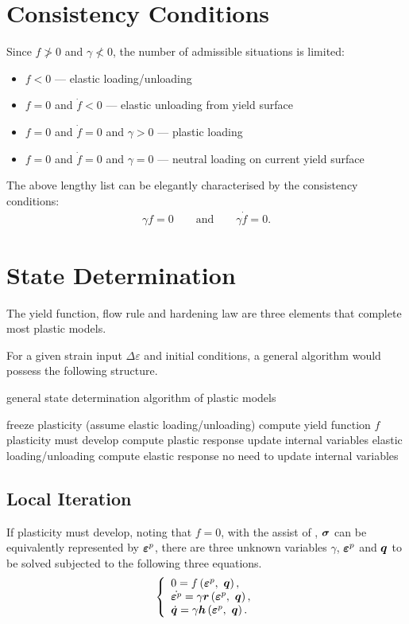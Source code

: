 \section{Consistency Conditions}
Since $f\ngtr0$ and $\gamma\nless0$, the number of admissible situations is limited:
\begin{itemize}
\item $f<0$ --- elastic loading/unloading
\item $f=0$ and $\dot{f}<0$ --- elastic unloading from yield surface
\item $f=0$ and $\dot{f}=0$ and $\gamma>0$ --- plastic loading
\item $f=0$ and $\dot{f}=0$ and $\gamma=0$ --- neutral loading on current yield surface
\end{itemize}
The above lengthy list can be elegantly characterised by the consistency conditions:
\begin{gather}\label{eq:consistency_condition}
\gamma{}f=0\qquad\text{and}\qquad\gamma\dot{f}=0.
\end{gather}
\section{State Determination}
The yield function, flow rule and hardening law are three elements that complete most plastic models.

For a given strain input $\Delta\varepsilon$ and initial conditions, a general algorithm would possess the following structure.
\begin{breakablealgorithm}
\caption{general state determination algorithm of plastic models}
\begin{algorithmic}[1]
\State freeze plasticity (assume elastic loading/unloading)
\State compute yield function $f$
	\State plasticity must develop
	\State compute plastic response
	\State update internal variables
\Else
	\State elastic loading/unloading
	\State compute elastic response
	\State no need to update internal variables
\EndIf
\end{algorithmic}
\end{breakablealgorithm}
\subsection{Local Iteration}
If plasticity must develop, noting that $f=0$, with the assist of , $\bm{\sigma}$ can be equivalently represented by $\bm{\varepsilon}^p$, there are three unknown variables $\gamma$, $\bm{\varepsilon}^p$ and $\bm{q}$ to be solved subjected to the following three equations.
\begin{gather}
\left\{
\begin{array}{l}
0=f\left(\bm{\varepsilon}^p,~\bm{q}\right),\\
\dot{\bm{\varepsilon}^p}=\gamma\bm{r}\left(\bm{\varepsilon}^p,~\bm{q}\right),\\
\dot{\bm{q}}=\gamma\bm{h}\left(\bm{\varepsilon}^p,~\bm{q}\right).
\end{array}\right.
\end{gather}

